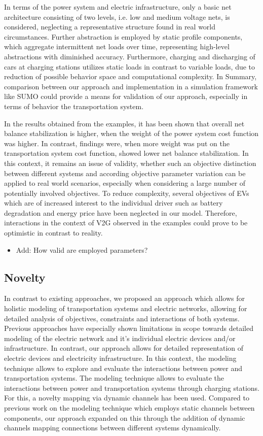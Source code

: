 In terms of the power system and electric infrastructure, only a basic net architecture consisting of two levels, i.e. low and medium voltage nets, is considered, neglecting a representative structure found in real world circumstances. Further abstraction is employed by static profile components, which aggregate intermittent net loads over time, representing high-level abstractions with diminished accuracy. Furthermore, charging and discharging of cars at charging stations utilizes static loads in contrast to variable loads, due to reduction of possible behavior space and computational complexity. In Summary, comparison between our approach and implementation in a simulation framework like SUMO could provide a means for validation of our approach, especially in terms of behavior the transportation system.

In the results obtained from the examples, it has been shown that overall net balance stabilization is higher, when the weight of the power system cost function was higher. In contrast, findings were, when more weight was put on the transportation system cost function, showed lower net balance stabilization. In this context, it remains an issue of validity, whether such an objective distinction between different systems and according objective parameter variation can be applied to real world scenarios, especially when considering a large number of potentially involved objectives. To reduce complexity, several objectives of EVs which are of increased interest to the individual driver such as battery degradation and energy price have been neglected in our model. Therefore, interactions in the context of V2G observed in the examples could prove to be optimistic in contrast to reality. 

\begin{itemize}
	\item Add: How valid are employed parameters?
\end{itemize}

\subsection{Novelty}

In contrast to existing approaches, we proposed an approach which allows for holistic modeling of transportation systems and electric networks, allowing for detailed analysis of objectives, constraints and interactions of both systems. Previous approaches have especially shown limitations in scope towards detailed modeling of the electric network and it's individual electric devices and/or infrastructure. In contrast, our approach allows for detailed representation of electric devices and electricity infrastructure. 
In this context, the modeling technique allows to explore and evaluate the interactions between power and transportation systems. 
The modeling technique allows to evaluate the interactions between power and transportation systems through charging stations. For this, a novelty mapping via dynamic channels has been used. Compared to previous work on the modeling technique which employs static channels between components, our approach expanded on this through the addition of dynamic channels mapping connections between different systems dynamically.

